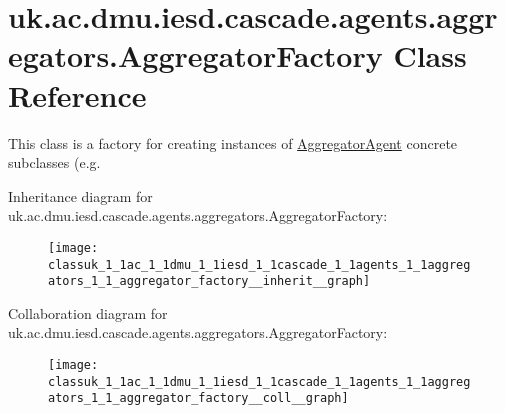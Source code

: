 \hypertarget{classuk_1_1ac_1_1dmu_1_1iesd_1_1cascade_1_1agents_1_1aggregators_1_1_aggregator_factory}{\section{uk.\-ac.\-dmu.\-iesd.\-cascade.\-agents.\-aggregators.\-Aggregator\-Factory Class Reference}
\label{classuk_1_1ac_1_1dmu_1_1iesd_1_1cascade_1_1agents_1_1aggregators_1_1_aggregator_factory}
}


This class is a factory for creating instances of {\ttfamily \hyperlink{classuk_1_1ac_1_1dmu_1_1iesd_1_1cascade_1_1agents_1_1aggregators_1_1_aggregator_agent}{Aggregator\-Agent}} concrete subclasses (e.\-g.  




Inheritance diagram for uk.\-ac.\-dmu.\-iesd.\-cascade.\-agents.\-aggregators.\-Aggregator\-Factory\-:\nopagebreak
\begin{figure}[H]
\begin{center}
\leavevmode
\texttt{[image: classuk\_1\_1ac\_1\_1dmu\_1\_1iesd\_1\_1cascade\_1\_1agents\_1\_1aggregators\_1\_1\_aggregator\_factory\_\_inherit\_\_graph]}
\end{center}
\end{figure}


Collaboration diagram for uk.\-ac.\-dmu.\-iesd.\-cascade.\-agents.\-aggregators.\-Aggregator\-Factory\-:\nopagebreak
\begin{figure}[H]
\begin{center}
\leavevmode
\texttt{[image: classuk\_1\_1ac\_1\_1dmu\_1\_1iesd\_1\_1cascade\_1\_1agents\_1\_1aggregators\_1\_1\_aggregator\_factory\_\_coll\_\_graph]}
\end{center}
\end{figure}
